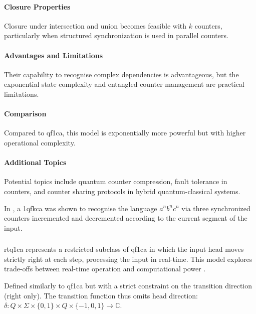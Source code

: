 \paragraph{Closure Properties}
Closure under intersection and union becomes feasible with $k$ counters, particularly when structured synchronization is used in parallel counters.

\paragraph{Advantages and Limitations}
Their capability to recognise complex dependencies is advantageous, but the exponential state complexity and entangled counter management are practical limitations.

\paragraph{Comparison}
Compared to \gls{qf1ca}, this model is exponentially more powerful but with higher operational complexity.

\paragraph{Additional Topics}
Potential topics include quantum counter compression, fault tolerance in counters, and counter sharing protocols in hybrid quantum-classical systems.

\begin{example}
In \cite{cem2012quantum}, a \gls{1qfkca} was shown to recognise the language $a^n b^n c^n$ via three synchronized counters incremented and decremented according to the current segment of the input.
\end{example}

\subsubsection{}

\gls{rtq1ca} represents a restricted subclass of \gls{qf1ca} in which the input head moves strictly right at each step, processing the input in real-time. This model explores trade-offs between real-time operation and computational power \cite{cem2012quantum}.

\begin{definition}
Defined similarly to \gls{qf1ca} but with a strict constraint on the transition direction (right only). The transition function thus omits head direction: $\delta: Q \times \Sigma \times \{0,1\} \times Q \times \{-1,0,1\} \rightarrow \mathbb{C}$.
\end{definition}

